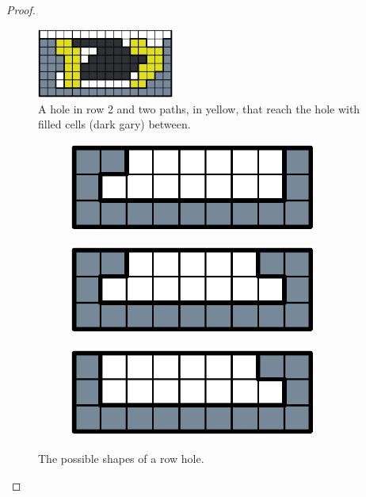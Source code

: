 \begin{proof}
\begin{figure}[h]
    \centering
    \includegraphics[width=0.4\textwidth]{./pictures/dominoes/hole-paths.pdf}
    \caption{A hole in row 2 and two paths, in yellow, that reach the hole with  filled cells (dark gary) between. }
    \label{dom:hole-paths} 
\end{figure}

\begin{figure}[ht]
  \centering
  \begin{subfigure}[b]{0.3\textwidth}
    \centering
    \includegraphics[width=0.9\textwidth]{pictures/dominoes/simple-hole-1.pdf}
    \caption{}
    \label{dom:hole-a}
  \end{subfigure}
  \begin{subfigure}[b]{0.3\textwidth}
    \centering
    \includegraphics[width=0.9\textwidth]{pictures/dominoes/simple-hole-2.pdf}
    \caption{}
    \label{dom:hole-b}
  \end{subfigure}
  \begin{subfigure}[b]{0.3\textwidth}
    \centering
    \includegraphics[width=0.9\textwidth]{pictures/dominoes/simple-hole-3.pdf}
    \caption{}
    \label{dom:hole-c}
  \end{subfigure}
    \caption{The possible shapes of a row hole.}
  \label{dom:holes}
\end{figure}


\end{proof}
